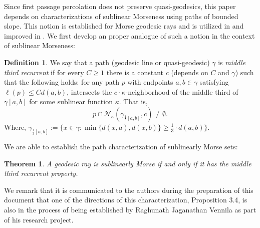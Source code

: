 \documentclass[12 pt]{amsart}
\newcommand{\calN}{\mathcal{N}}
\newcommand{\EE}{\mathbb{E}}
\newtheorem{introthm}{Theorem}
\theoremstyle{definition}
\newtheorem{definition}[theorem]{Definition}
\theoremstyle{remark}
\newcommand{\pka}{\partial_{\kappa}}
\begin{document}
Since first passage percolation does not preserve quasi-geodesics, this paper depends on characterizations of sublinear Morseness using paths of bounded slope. This notion is established for Morse geodesic rays and is utilized  in \cite{DMS} and improved in \cite{ADT}. We first develop an proper analogue of such a notion in the context of sublinear Morseness:
\begin{definition} \label{def:middle recurrent}
We say that a path (geodesic line or quasi-geodesic) $\gamma$ is \emph{middle third recurrent} if for every $C\geq1$ there is a constant $c$ (depends on $C$ and $\gamma$) such that the following holds: 
    for any path $p$ with endpoints $a,b \in \gamma$ satisfying $\ell(p)\leq Cd(a,b)$, intersects the $c\cdot \kappa$-neighborhood of the middle third of $\gamma[a,b]$ for some sublinear function $\kappa$. That is,
\[ p \cap \calN_{\kappa} (\gamma_{\frac 13[a,b]}, c )\neq \emptyset.\]
Where, $\gamma_{\frac{1}{3}[a,b]} := \biggl\{x\in \gamma : \min \{d(x,a),d(x,b)\} \ge \frac{1}{3}\cdot d(a,b)\biggr\}$.
\end{definition}
We are able to establish the path characterization of sublinearly Morse sets:

\begin{introthm}\label{introthm2}
A geodesic ray is sublinearly Morse if and only if it has the middle third recurrent property.

\end{introthm}

We remark that it is communicated to the authors during the preparation of this document that one of the directions of this characterization, Proposition 3.4, is also in the process of being established by Raghunath
Jaganathan Vennila as part of his research project. 


\end{document}
